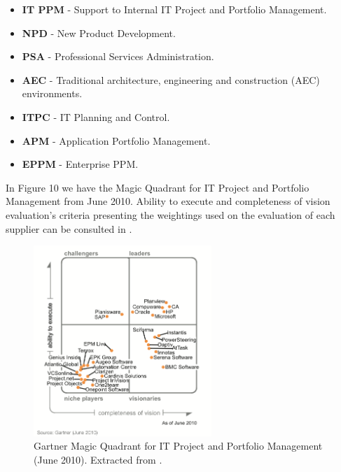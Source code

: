 \begin{itemize}
\item \textbf{IT PPM} - Support to Internal IT Project and Portfolio Management.
\item \textbf{NPD} - New Product Development.
\item \textbf{PSA} - Professional Services Administration.
\item \textbf{AEC} - Traditional architecture, engineering and construction (AEC) environments.
\item \textbf{ITPC} - IT Planning and Control.
\item \textbf{APM} - Application Portfolio Management.
\item \textbf{EPPM} - Enterprise PPM.
\end{itemize}

In Figure 10 we have the Magic Quadrant for IT Project and Portfolio Management from June 2010. Ability to execute and completeness of vision evaluation's criteria presenting the weightings used on the evaluation of each supplier can be consulted in \cite{magicQuadrantPPM}.\par

\begin{figure}[h!]
\centering
\includegraphics[width=0.6\textwidth]{img/MQPPMTools.png}
\caption{Gartner Magic Quadrant for IT Project and Portfolio Management (June 2010). Extracted from \cite{magicQuadrantPPM}.}
\end{figure}


